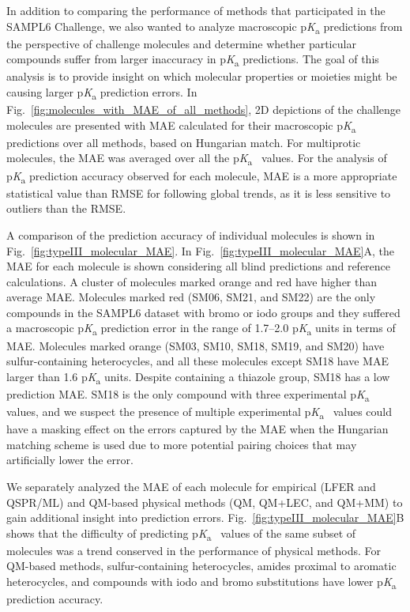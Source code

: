 \documentclass[9pt,lineno,final]{elife}
\newcommand{\pKa}{p\textit{K}\textsubscript{a}}
\begin{document}
In addition to comparing the performance of methods that participated in the SAMPL6 Challenge, we also wanted to analyze macroscopic \pKa{} predictions from the perspective of challenge molecules and determine whether particular compounds suffer from larger inaccuracy in \pKa{} predictions. 
The goal of this analysis is to provide insight on which molecular properties or moieties might be causing larger \pKa{} prediction errors. 
In Fig.~\ref{fig:molecules_with_MAE_of_all_methods}, 2D depictions of the challenge molecules are presented with MAE calculated for their macroscopic \pKa{} predictions over all methods, based on Hungarian match. 
For multiprotic molecules, the MAE was averaged over all the \pKa{}~ values. 
For the analysis of \pKa{} prediction accuracy observed for each molecule, MAE is a more appropriate statistical value than RMSE for following global trends, as it is less sensitive to outliers than the RMSE.

A comparison of the prediction accuracy of individual molecules is shown in Fig.~\ref{fig:typeIII_molecular_MAE}. 
In Fig.~\ref{fig:typeIII_molecular_MAE}A, the MAE for each molecule is shown considering all blind predictions and reference calculations. 
A cluster of molecules marked orange and red have higher than average MAE. 
Molecules marked red (SM06, SM21, and SM22) are the only compounds in the SAMPL6 dataset with bromo or iodo groups and they suffered a macroscopic \pKa{} prediction error in the range of 1.7--2.0 \pKa{} units in terms of MAE.
Molecules marked orange (SM03, SM10, SM18, SM19, and SM20) have sulfur-containing heterocycles, and all these molecules except SM18 have MAE larger than 1.6 \pKa{} units.
Despite containing a thiazole group, SM18 has a low prediction MAE.
SM18 is the only compound with three experimental \pKa{}~ values, and we suspect the presence of multiple experimental \pKa{}~ values could have a masking effect on the errors captured by the MAE when the Hungarian matching scheme is used due to more potential pairing choices that may artificially lower the error.

We separately analyzed the MAE of each molecule for empirical (LFER and QSPR/ML) and QM-based physical methods (QM, QM+LEC, and QM+MM) to gain additional insight into prediction errors. 
Fig.~\ref{fig:typeIII_molecular_MAE}B shows that the difficulty of predicting \pKa{}~ values of the same subset of molecules was a trend conserved in the performance of physical methods.
For QM-based methods, sulfur-containing heterocycles, amides proximal to aromatic heterocycles, and compounds with iodo and bromo substitutions have lower \pKa{} prediction accuracy.
\end{document}
